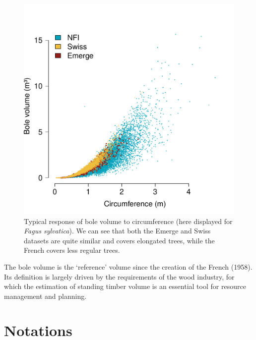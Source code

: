 \begin{figure}[h]
	\centering
	\includegraphics[scale = 0.4]{Figures/resp_fagus.pdf}
	\caption{Typical response of bole volume to circumference (here displayed for \textit{Fagus sylvatica}). We can see that both the Emerge and Swiss datasets \parencite{Deleuze2013,Didion2024} are quite similar and covers elongated trees, while the French \NFI{} covers less regular trees. \label{fig::fagSyl}}
\end{figure}

\begin{tcolorbox}[breakable, title = Bole volume (volume bois-fort tige)]
	The bole volume is the `reference' volume since the creation of the French \NFI{} (1958). Its definition is largely driven by the requirements of the wood industry, for which the estimation of standing timber volume is an essential tool for resource management and planning.
\end{tcolorbox}

\section{Notations}


